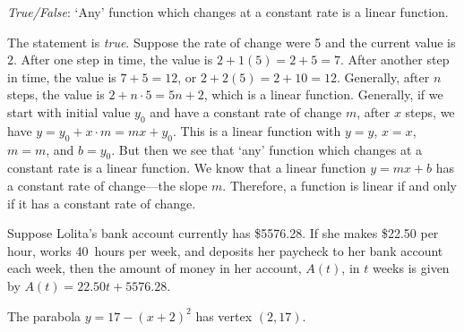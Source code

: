 \documentclass[11pt,letterpaper]{article}
\begin{document}
\quizsol \textit{True/False}: `Any' function which changes at a constant rate is a linear function. \pspace

\sol The statement is \textit{true}. Suppose the rate of change were 5 and the current value is 2. After one step in time, the value is $2 + 1(5)= 2 + 5= 7$. After another step in time, the value is $7 + 5= 12$, or $2 + 2(5)= 2 + 10= 12$. Generally, after $n$ steps, the value is $2 + n \cdot 5= 5n + 2$, which is a linear function. Generally, if we start with initial value $y_0$ and have a constant rate of change $m$, after $x$ steps, we have $y= y_0 + x \cdot m= mx + y_0$. This is a linear function with $y= y$, $x= x$, $m= m$, and $b= y_0$. But then we see that `any' function which changes at a constant rate is a linear function. We know that a linear function $y= mx + b$ has a constant rate of change---the slope $m$. Therefore, a function is linear if and only if it has a constant rate of change. 


Suppose Lolita's bank account currently has \$5576.28. If she makes \$22.50 per hour, works 40~hours per week, and deposits her paycheck to her bank account each week, then the amount of money in her account, $A(t)$, in $t$ weeks is given by $A(t)= 22.50t + 5576.28$. 

The parabola $y= 17 - (x + 2)^2$ has vertex $(2, 17)$. 
\end{document}
